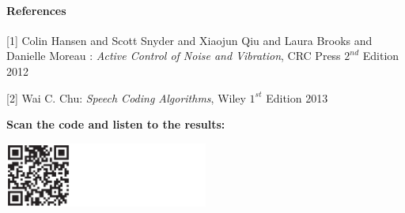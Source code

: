 \documentclass[a4paper]{article}
\begin{document}
	
	\paragraph{References}
	\begin{description}
		\item{[1]}		Colin Hansen and Scott Snyder and Xiaojun Qiu and Laura Brooks and Danielle Moreau  : \emph{Active Control of Noise and Vibration}, CRC Press $2^{nd}$ Edition 2012
		\item{[2]}		Wai C. Chu: \emph{Speech Coding Algorithms}, Wiley $1^{st}$ Edition 2013
	\end{description}
	\vspace{5mm}
		
	\noindent
	\textbf{Scan the code and listen to the results:}\\
	\vspace{-2mm}
	
	\includegraphics[width=0.5\textwidth]{QRCODE}
\end{document}
